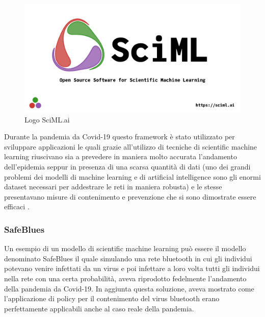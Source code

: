 \begin{figure}[h]
    \includegraphics[width=\linewidth]{img/SciMLGitHubPreview.png}
    \caption{Logo SciML.ai}
    \label{fig:SciML.ai}
\end{figure}

Durante la pandemia da Covid-19 questo framework è stato 
utilizzato per sviluppare applicazioni le quali grazie 
all’utilizzo di tecniche di scientific machine learning 
riuscivano sia a prevedere in maniera molto accurata 
l’andamento dell’epidemia seppur in presenza di una scarsa 
quantità di dati (uno dei grandi problemi dei modelli di 
machine learning e di artificial intelligence sono gli enormi 
dataset necessari per addestrare le reti in maniera robusta) 
e le stesse presentavano misure di contenimento e prevenzione 
che si sono dimostrate essere efficaci 
\cite{10.1371/journal.pdig.0000142} \cite{DANDEKAR2021100220}. 

\subsubsection{SafeBlues}
Un esempio di un modello di scientific machine learning può 
essere il modello denominato SafeBlues 
\cite{10.1371/journal.pdig.0000142} \cite{DANDEKAR2021100220} il quale simulando una 
rete bluetooth in cui gli individui potevano venire infettati 
da un virus e poi infettare a loro volta tutti gli individui 
nella rete con una certa probabilità, aveva riprodotto 
fedelmente l’andamento della pandemia da Covid-19. 
In aggiunta questa soluzione, aveva mostrato come 
l’applicazione di policy per il contenimento del virus 
bluetooth erano perfettamente applicabili anche al caso 
reale della pandemia. 

